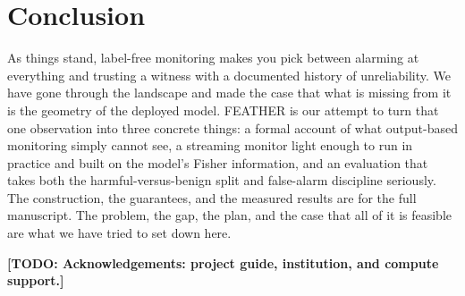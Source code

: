 \documentclass[graybox]{SNmult}
\newcommand{\todo}[1]{\textbf{[TODO: #1]}}
\begin{document}
\section{Conclusion}
\label{sec:conclusion}

As things stand, label-free monitoring makes you pick between alarming
at everything and trusting a witness with a documented history of
unreliability. We have gone through the landscape and made the case that
what is missing from it is the geometry of the deployed model. FEATHER
is our attempt to turn that one observation into three concrete things:
a formal account of what output-based monitoring simply cannot see, a
streaming monitor light enough to run in practice and built on the
model's Fisher information, and an evaluation that takes both the
harmful-versus-benign split and false-alarm discipline seriously. The
construction, the guarantees, and the measured results are for the full
manuscript. The problem, the gap, the plan, and the case that all of it
is feasible are what we have tried to set down here.

\begin{acknowledgement}
\todo{Acknowledgements: project guide, institution, and compute support.}
\end{acknowledgement}




\end{document}

